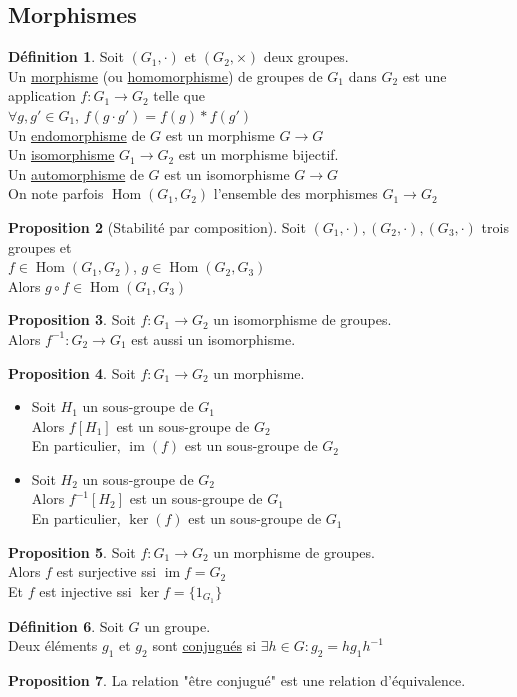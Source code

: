 \documentclass[10pt,a4paper]{article}
\theoremstyle{definition}
\newtheorem{proposition}{Proposition}[section]
\newtheorem{definition}[proposition]{Définition}
\DeclareMathOperator{\Hom}{Hom}
\DeclareMathOperator{\im}{im}
\begin{document}
\subsection{Morphismes}
\begin{definition}
Soit $(G_1, \cdot)$ et $(G_2, \times)$ deux groupes. \\
Un \uline{morphisme} (ou \uline{homomorphisme}) de groupes de $G_1$ dans $G_2$ est une application $f: G_1 \to G_2$ telle que \\
$\forall g, g' \in G_1$, $f(g \cdot g') = f(g) * f(g')$ \\
Un \uline{endomorphisme} de $G$ est un morphisme $G \to G$ \\
Un \uline{isomorphisme} $G_1 \to G_2$ est un morphisme bijectif. \\
Un \uline{automorphisme} de $G$ est un isomorphisme $G \to G$ \\
On note parfois $\Hom(G_1, G_2)$ l'ensemble des morphismes $G_1 \to G_2$
\end{definition}
\begin{proposition}[Stabilité par composition]
Soit $(G_1, \cdot), (G_2, \cdot), (G_3, \cdot)$ trois groupes et \\
$f \in \Hom(G_1, G_2)$, $g \in \Hom(G_2, G_3)$ \\
Alors $g \circ f \in \Hom(G_1, G_3)$
\end{proposition}
\begin{proposition}
Soit $f: G_1 \to G_2$ un isomorphisme de groupes. \\
Alors $f^{-1}: G_2 \to G_1$ est aussi un isomorphisme.
\end{proposition}
\begin{proposition}
Soit $f: G_1 \to G_2$ un morphisme.
\begin{itemize}
\item Soit $H_1$ un sous-groupe de $G_1$ \\
Alors $f[H_1]$ est un sous-groupe de $G_2$ \\
En particulier, $\im(f)$ est un sous-groupe de $G_2$
\item Soit $H_2$ un sous-groupe de $G_2$ \\
Alors $f^{-1}[H_2]$ est un sous-groupe de $G_1$ \\
En particulier, $\ker(f)$ est un sous-groupe de $G_1$
\end{itemize}
\end{proposition}
\begin{proposition}
Soit $f: G_1 \to G_2$ un morphisme de groupes. \\
Alors $f$ est surjective ssi $\im f = G_2$ \\
Et $f$ est injective ssi $\ker f = \{ 1_{G_1} \}$
\end{proposition}
\begin{definition}
Soit $G$ un groupe. \\
Deux éléments $g_1$ et $g_2$ sont \uline{conjugués} si $\exists h \in G: g_2 = h g_1 h^{-1}$
\end{definition}
\begin{proposition}
La relation "être conjugué" est une relation d'équivalence.
\end{proposition}
\end{document}
